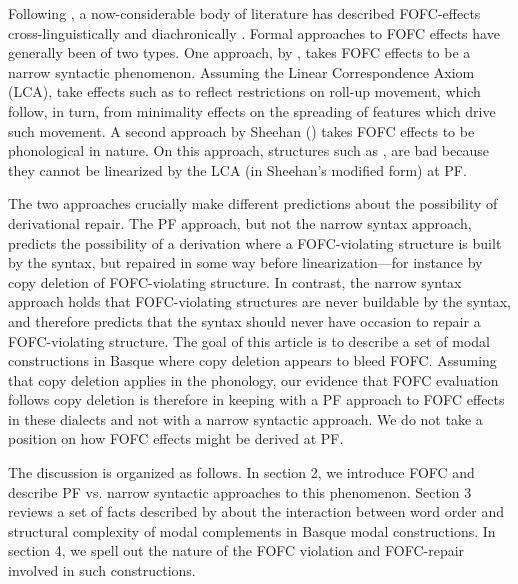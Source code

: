 \documentclass[output=paper]{langscibook}
\begin{document}
Following \cite{holmberg2000}, a now-considerable body of literature has described FOFC-effects cross-linguistically 
 \citep{holmberg2000,biberaueretal2008,biberaueretal2014, sheehan2013, sheehan2012} and diachronically \citep{biberaueretal2009, biberaueretal2010}. Formal approaches to FOFC effects have generally been of two types.\footnotemark\protect{}  One approach, by \cite{biberaueretal2014}, takes FOFC effects to be a narrow syntactic phenomenon.  Assuming the Linear Correspondence Axiom (LCA)\citep{kayne1994}, \cite{biberaueretal2014} take effects such as \LLast to reflect restrictions on roll-up movement, which follow, in turn, from minimality effects on the spreading of features which drive such movement.  A second approach by Sheehan (\citeyear{sheehan2013, sheehan2012, sheehan2012b}) takes FOFC effects to be phonological in nature.  On this approach, structures such as \LLast[d], are bad because they cannot be linearized by the LCA (in Sheehan's modified form) at PF.  

The two approaches crucially make different predictions about the possibility of derivational repair.  
The PF approach, but not the narrow syntax approach, predicts the possibility of a derivation where a FOFC-violating structure is built by the syntax, but repaired in some way before linearization---for instance by copy deletion of FOFC-violating structure.  In contrast, the narrow syntax approach holds that FOFC-violating structures are never buildable by the syntax, and therefore predicts that the syntax should never have occasion to repair a FOFC-violating structure.  The goal of this article is to describe a set of modal constructions in Basque where copy deletion appears to bleed FOFC.  Assuming that copy deletion applies in the phonology, our evidence that FOFC evaluation follows copy deletion is therefore in keeping with a PF approach to FOFC effects in these dialects and not with a narrow syntactic approach. We do not take a position on how FOFC effects might be derived at PF.

The discussion is organized as follows.  In section 2, we introduce FOFC and describe PF vs. narrow syntactic approaches to this phenomenon.  Section 3 reviews a set of facts described by \cite{etxepare-uribeetxebarria2009} about the interaction between word order and structural complexity of modal complements in Basque modal constructions.  In section 4, we spell out the nature of the FOFC violation and FOFC-repair involved in such constructions.  
\end{document}
